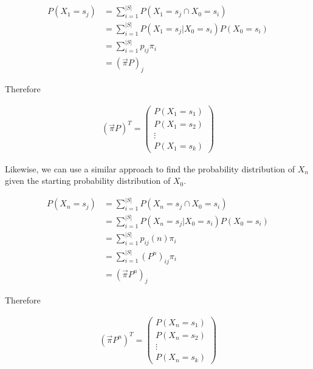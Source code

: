 \documentclass[a4paper, 12pt]{article}
\begin{document}
	\begin{equation*}
	\begin{aligned}
		P(X_1 = s_j) &= \sum_{i=1}^{|S|} P(X_1 = s_j \cap X_0 = s_i) \\
				 	 &= \sum_{i=1}^{|S|} P(X_1 = s_j | X_0 = s_i)P(X_0 = s_i) \\
			     	 &= \sum_{i=1}^{|S|} p_{ij}\pi_i \\
			     	 &= (\vec{\pi}P)_j
	\end{aligned}
	\end{equation*}	
			     	 
	Therefore
	
	\begin{equation*}
	\begin{aligned}
		 (\vec{\pi}P)^T =
		 \begin{pmatrix}
		 P(X_1 = s_1) \\
		 P(X_1 = s_2) \\ 
		 \vdots \\
		 P(X_1 = s_k)
		 \end{pmatrix}
	\end{aligned}
	\end{equation*}
	
Likewise, we can use a similar approach to find the probability distribution of $X_n$ given the starting probability distribution of $X_0$. 

	\begin{equation*}
	\begin{aligned}
		P(X_n = s_j) &= \sum_{i=1}^{|S|} P(X_n = s_j \cap X_0 = s_i) \\
				 	 &= \sum_{i=1}^{|S|} P(X_n = s_j | X_0 = s_i)P(X_0 = s_i) \\
			     	 &= \sum_{i=1}^{|S|} p_{ij}(n)\pi_i \\
			     	 &= \sum_{i=1}^{|S|} (P^n)_{ij}\pi_i \\
			     	 &= (\vec{\pi}P^n)_j
	\end{aligned}
	\end{equation*}	
	
	Therefore
	
	\begin{equation*}
	\begin{aligned}
		 (\vec{\pi}P^n)^T =
		 \begin{pmatrix}
		 P(X_n = s_1) \\
		 P(X_n = s_2) \\ 
		 \vdots \\
		 P(X_n = s_k)
		 \end{pmatrix}
	\end{aligned}
	\end{equation*}
	
\end{document}
